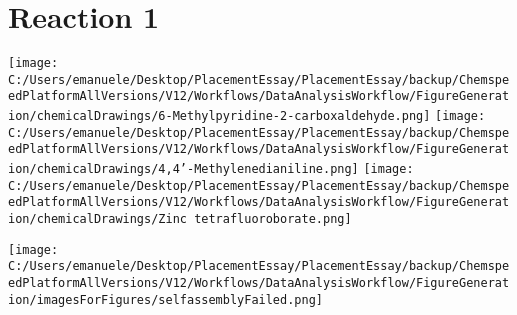 \documentclass{article}%
\begin{document}
%
\normalsize%
\tableofcontents%
\section*{Reaction 1}%
%
\begin{scheme}[H]%
\begin{minipage}{0.5\textwidth}%
\texttt{[image: C:/Users/emanuele/Desktop/PlacementEssay/PlacementEssay/backup/ChemspeedPlatformAllVersions/V12/Workflows/DataAnalysisWorkflow/FigureGeneration/chemicalDrawings/6-Methylpyridine-2-carboxaldehyde.png]}%
\texttt{[image: C:/Users/emanuele/Desktop/PlacementEssay/PlacementEssay/backup/ChemspeedPlatformAllVersions/V12/Workflows/DataAnalysisWorkflow/FigureGeneration/chemicalDrawings/4,4'-Methylenedianiline.png]}%
\texttt{[image: C:/Users/emanuele/Desktop/PlacementEssay/PlacementEssay/backup/ChemspeedPlatformAllVersions/V12/Workflows/DataAnalysisWorkflow/FigureGeneration/chemicalDrawings/Zinc tetrafluoroborate.png]}%
\end{minipage}%
\begin{minipage}{0.5\textwidth}%
\begin{center}%
\texttt{[image: C:/Users/emanuele/Desktop/PlacementEssay/PlacementEssay/backup/ChemspeedPlatformAllVersions/V12/Workflows/DataAnalysisWorkflow/FigureGeneration/imagesForFigures/selfassemblyFailed.png]}%
\end{center}%
\end{minipage}%
\caption{Self-assembly of components 8, 17, with Zinc(II) in a 3.0:1.5:1.0 molar ratio in CH$_3$CN at 60\textdegree C for 40h. These are the reagents (starting materials) for reaction 1.}%
\end{scheme}%
\end{document}
